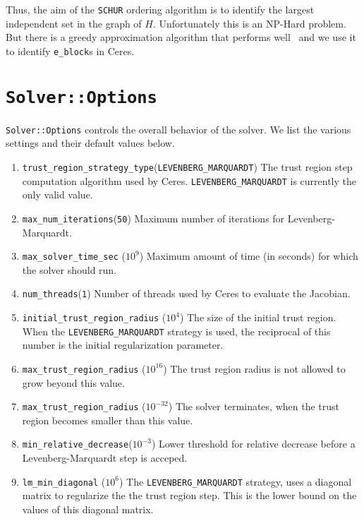 Thus, the aim of the \texttt{SCHUR} ordering algorithm is to identify the largest independent set in the graph of $H$. Unfortunately this is an NP-Hard problem. But there is a  greedy approximation algorithm that performs well~\cite{li2007miqr} and we use it to identify \texttt{e\_block}s in Ceres.

\section{\texttt{Solver::Options}}

\texttt{Solver::Options} controls the overall behavior of the solver. We list the various settings and their default values below.

\begin{enumerate}
	
\item{\texttt{trust\_region\_strategy\_type}}(\texttt{LEVENBERG\_MARQUARDT}) The  trust region step computation algorithm used by Ceres. \texttt{LEVENBERG\_MARQUARDT} is currently the only valid value.

\item{\texttt{max\_num\_iterations}}(\texttt{50}) Maximum number of iterations for Levenberg-Marquardt.

\item{\texttt{max\_solver\_time\_sec}} ($10^9$) Maximum amount of time (in seconds) for which the solver should run.

\item{\texttt{num\_threads}}(\texttt{1})
Number of threads used by Ceres to evaluate the Jacobian.

\item{\texttt{initial\_trust\_region\_radius} ($10^4$)} The size of the initial trust region. When the \texttt{LEVENBERG\_MARQUARDT} strategy is used, the reciprocal of this number is the initial regularization parameter.

\item{\texttt{max\_trust\_region\_radius} ($10^{16}$)} The trust region radius is not allowed to grow beyond this value.
\item{\texttt{max\_trust\_region\_radius} ($10^{-32}$)} The solver terminates, when the trust region becomes smaller than this value.

\item{\texttt{min\_relative\_decrease}}($10^{-3}$) Lower threshold for relative decrease before a Levenberg-Marquardt step is acceped.

\item{\texttt{lm\_min\_diagonal} ($10^6$)} The \texttt{LEVENBERG\_MARQUARDT} strategy, uses a diagonal matrix to regularize the the trust region step. This is the lower bound on the values of this diagonal matrix.


\end{enumerate}
